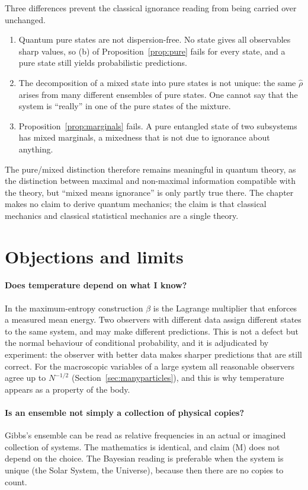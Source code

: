 Three differences prevent the classical ignorance reading from being carried over unchanged.
\begin{enumerate}[nosep]
\item Quantum pure states are not dispersion-free. No state gives all observables sharp values, so (b) of Proposition~\ref{prop:pure} fails for every state, and a pure state still yields probabilistic predictions.
\item The decomposition of a mixed state into pure states is not unique: the same $\hat\rho$ arises from many different ensembles of pure states. One cannot say that the system is ``really'' in one of the pure states of the mixture.
\item Proposition~\ref{prop:marginals} fails. A pure entangled state of two subsystems has mixed marginals, a mixedness that is not due to ignorance about anything.
\end{enumerate}
The pure/mixed distinction therefore remains meaningful in quantum theory, as the distinction between maximal and non-maximal information compatible with the theory, but ``mixed means ignorance'' is only partly true there. The chapter makes no claim to derive quantum mechanics; the claim is that classical mechanics and classical statistical mechanics are a single theory.

\section{Objections and limits}
\label{sec:objections}

\paragraph{Does temperature depend on what I know?} In the maximum-entropy construction $\beta$ is the Lagrange multiplier that enforces a measured mean energy. Two observers with different data assign different states to the same system, and may make different predictions. This is not a defect but the normal behaviour of conditional probability, and it is adjudicated by experiment: the observer with better data makes sharper predictions that are still correct. For the macroscopic variables of a large system all reasonable observers agree up to $N^{-1/2}$ (Section~\ref{sec:manyparticles}), and this is why temperature appears as a property of the body.

\paragraph{Is an ensemble not simply a collection of physical copies?} Gibbs's ensemble can be read as relative frequencies in an actual or imagined collection of systems. The mathematics is identical, and claim (M) does not depend on the choice. The Bayesian reading is preferable when the system is unique (the Solar System, the Universe), because then there are no copies to count.

